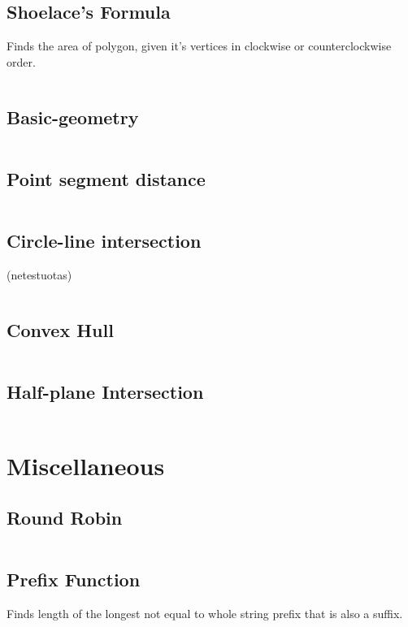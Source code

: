 \documentclass[8pt,a4paper,landscape,oneside]{amsart}
\newcommand{\code}[1]{\inputminted[fontsize=\normalsize,baselinestretch=1]{cpp}{_code/#1}}
\begin{document}
\begin{multicols*}{3}
	\subsection{Shoelace's Formula}
	
	Finds the area of polygon, given it's vertices in clockwise or counterclockwise order.
	
	\code{geometry/shoelace.cpp}

	\subsection{Basic-geometry}
	
	\code{geometry/basic_geometry.cpp}
	
	\subsection{Point segment distance}
	
	\code{geometry/point_segment_distance.cpp}
	
	\subsection{Circle-line intersection}
	
	(netestuotas)
	
	\code{geometry/circle_line_intersection.cpp}
	
	\subsection{Convex Hull}
	
	\code{geometry/convex_hull.cpp}

	\subsection{Half-plane Intersection}
	
	\code{geometry/half_plane_intersection.cpp}
	
\section{Miscellaneous}

	\subsection{Round Robin}

	\code{miscellaneous/round_robin.cpp}
	
	\subsection{Prefix Function}
	
	Finds length of the longest not equal to whole string prefix that is also a suffix.
	
	\code{miscellaneous/prefix_function.cpp}

\end{multicols*}
\end{document}
